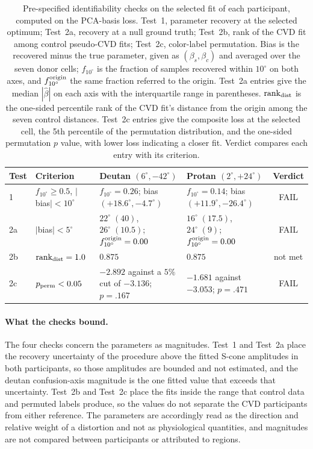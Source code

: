 \begin{table}[h]
\centering
\caption{Pre-specified identifiability checks on the selected fit of each participant, computed on the PCA-basis loss. Test~1, parameter recovery at the selected optimum; Test~2a, recovery at a null ground truth; Test~2b, rank of the CVD fit among control pseudo-CVD fits; Test~2c, color-label permutation. Bias is the recovered minus the true parameter, given as $(\beta_s, \beta_c)$ and averaged over the seven donor cells; $f_{10^\circ}$ is the fraction of samples recovered within $10^\circ$ on both axes, and $f_{10^\circ}^{\rm origin}$ the same fraction referred to the origin. Test~2a entries give the median $|\hat\beta|$ on each axis with the interquartile range in parentheses. ${\rm rank}_{\rm dist}$ is the one-sided percentile rank of the CVD fit's distance from the origin among the seven control distances. Test~2c entries give the composite loss at the selected cell, the 5th percentile of the permutation distribution, and the one-sided permutation $p$ value, with lower loss indicating a closer fit. Verdict compares each entry with its criterion.}
\label{tab:identifiability}
\small
\begin{tabularx}{\textwidth}{llYYc}
\toprule
Test & Criterion & Deutan $(6^\circ, -42^\circ)$ & Protan $(2^\circ, +24^\circ)$ & Verdict \\
   & $f_{10^\circ} \geq 0.5$, $|$bias$| < 10^\circ$ & $f_{10^\circ} = 0.26$; bias $(+18.6^\circ, -4.7^\circ)$ & $f_{10^\circ} = 0.14$; bias $(+11.9^\circ, -26.4^\circ)$ & FAIL \\
2a  & $|$bias$| < 5^\circ$ & $22^\circ\;(40)$, $26^\circ\;(10.5)$; $f_{10^\circ}^{\rm origin} = 0.00$ & $16^\circ\;(17.5)$, $24^\circ\;(9)$; $f_{10^\circ}^{\rm origin} = 0.00$ & FAIL \\
2b  & ${\rm rank}_{\rm dist} = 1.0$ & $0.875$ & $0.875$ & not met \\
2c  & $p_{\rm perm} < 0.05$ & $-2.892$ against a $5\%$ cut of $-3.136$; $p = .167$ & $-1.681$ against $-3.053$; $p = .471$ & FAIL \\
\bottomrule
\end{tabularx}
\end{table}

\paragraph{What the checks bound.}
The four checks concern the parameters as magnitudes. Test~1 and Test~2a place
the recovery uncertainty of the procedure above the fitted S-cone amplitudes in
both participants, so those amplitudes are bounded and not estimated, and the
deutan confusion-axis magnitude is the one fitted value that exceeds that
uncertainty. Test~2b and Test~2c place the fits inside the range that control
data and permuted labels produce, so the values do not separate the CVD
participants from either reference. The parameters are accordingly read as the
direction and relative weight of a distortion and not as physiological
quantities, and magnitudes are not compared between participants or attributed
to regions.

